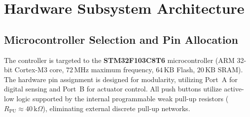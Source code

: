 \documentclass[12pt]{article}
\begin{document}
\section{Hardware Subsystem Architecture}

\subsection{Microcontroller Selection and Pin Allocation}
The controller is targeted to the \textbf{STM32F103C8T6} microcontroller (ARM 32-bit Cortex-M3 core, $72\,\text{MHz}$ maximum frequency, $64\,\text{KB}$ Flash, $20\,\text{KB}$ SRAM). The hardware pin assignment is designed for modularity, utilizing Port~A for digital sensing and Port~B for actuator control. All push buttons utilize active-low logic supported by the internal programmable weak pull-up resistors ($R_{\text{PU}} \approx 40\,\text{k}\Omega$), eliminating external discrete pull-up networks.
\end{document}
